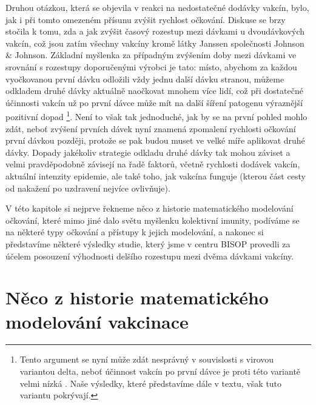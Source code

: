 Druhou otázkou, která se objevila v reakci na nedostatečné dodávky vakcín, bylo, jak i při tomto omezeném přísunu zvýšit rychlost očkování. Diskuse se brzy stočila k tomu, zda a jak zvýšit časový rozestup mezi dávkami u dvoudávkových vakcín, což jsou zatím všechny vakcíny kromě látky Janssen společnosti Johnson \& Johnson. Základní myšlenka za případným zvýšením doby mezi dávkami ve srovnání s rozestupy doporučenými výrobci je tato: místo, abychom za každou vyočkovanou první dávku odložili vždy jednu další dávku stranou, můžeme odkladem druhé dávky aktuálně naočkovat mnohem více lidí, což při dostatečné účinnosti vakcín už po první dávce může mít na další šíření patogenu výraznější pozitivní dopad \cite{Paltiel_etal2021,Tuite_etal2021}\footnote{Tento argument se nyní může zdát nesprávný v souvislosti s virovou variantou delta, neboť účinnost vakcín po první dávce je proti této variantě velmi nízká \cite{delta}. Naše výsledky, které představíme dále v textu, však tuto variantu pokrývají.}. Není to však tak jednoduché, jak by se na první pohled mohlo zdát, neboť zvýšení prvních dávek nyní znamená zpomalení rychlosti očkování první dávkou později, protože se pak budou muset ve velké míře aplikovat druhé dávky. Dopady jakékoliv strategie odkladu druhé dávky tak mohou záviset a velmi pravděpodobně závisejí na řadě faktorů, včetně rychlosti dodávek vakcín, aktuální intenzity epidemie, ale také toho, jak vakcína funguje (kterou část cesty od nakažení po uzdravení nejvíce ovlivňuje). 

V této kapitole si nejprve řekneme něco z historie matematického modelování očkování, které mimo jiné dalo světu myšlenku kolektivní imunity, podíváme se na některé typy očkování a přístupy k jejich modelování, a nakonec si představíme některé výsledky studie, který jsme v centru BISOP provedli za účelem posouzení výhodnosti delšího rozestupu mezi dvěma dávkami vakcíny.

\section*{Něco z historie matematického modelování vakcinace}

